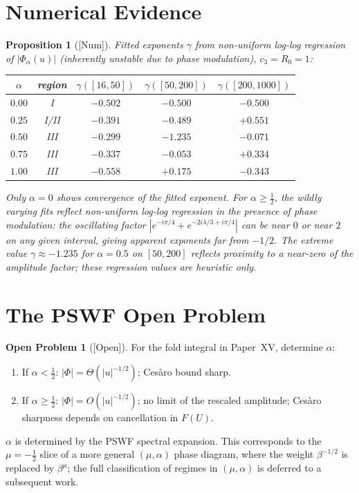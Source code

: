 \documentclass[12pt,a4paper]{amsart}
\newtheorem{proposition}[theorem]{Proposition}
\theoremstyle{definition}
\newtheorem{problem}[theorem]{Open Problem}
\newcommand{\Num}{\textup{[Num]}}
\newcommand{\Open}{\textup{[Open]}}
\begin{document}
\section{Numerical Evidence}
\label{sec:num}

\begin{proposition}[\Num]
Fitted exponents $\gamma$ from
non-uniform log-log regression of $|\Phi_\alpha(u)|$
(inherently unstable due to phase modulation),
$c_3=R_0=1$:
\begin{center}
\begin{tabular}{c|c|c|c|c}
$\alpha$ & region
  & $\gamma([16,50])$
  & $\gamma([50,200])$
  & $\gamma([200,1000])$
\\\hline
$0.00$ & I & $-0.502$ & $-0.500$ & $-0.500$ \\
$0.25$ & I/II & $-0.391$ & $-0.489$ & $+0.551$ \\
$0.50$ & III & $-0.299$ & $-1.235$ & $-0.071$ \\
$0.75$ & III & $-0.337$ & $-0.053$ & $+0.334$ \\
$1.00$ & III & $-0.558$ & $+0.175$ & $-0.343$
\end{tabular}
\end{center}
Only $\alpha=0$ shows convergence
of the fitted exponent.
For $\alpha\ge\tfrac{1}{2}$,
the wildly varying fits reflect non-uniform log-log
regression in the presence of phase modulation:
the oscillating factor $|e^{-i\pi/4}+e^{-2i\lambda/3+i\pi/4}|$
can be near $0$ or near $2$ on any given interval,
giving apparent exponents far from $-1/2$.
The extreme value $\gamma\approx-1.235$
for $\alpha=0.5$ on $[50,200]$ reflects
proximity to a near-zero of the amplitude factor;
these regression values are heuristic only.
\end{proposition}

\section{The PSWF Open Problem}
\label{sec:PSWF}

\begin{problem}[\Open]
\label{prob:PSWF}
For the fold integral in Paper~XV,
determine $\alpha$:
\begin{enumerate}[{\rm(i)}]
\item If $\alpha<\tfrac{1}{2}$:
  $|\Phi|=\Theta(|u|^{-1/2})$;
  Ces\`aro bound sharp.
\item If $\alpha\ge\tfrac{1}{2}$:
  $|\Phi|=O(|u|^{-1/2})$;
  no limit of the rescaled amplitude;
  Ces\`aro sharpness depends
  on cancellation in $F(U)$.
\end{enumerate}
$\alpha$ is determined by the PSWF spectral expansion.
This corresponds to the $\mu=-\tfrac{1}{2}$ slice
of a more general $(\mu,\alpha)$ phase diagram,
where the weight $\beta^{-1/2}$ is replaced by $\beta^\mu$;
the full classification of regimes in $(\mu,\alpha)$
is deferred to a subsequent work.
\end{problem}
\end{document}
